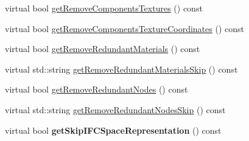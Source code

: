 \begin{DoxyCompactItemize}
\item 
virtual bool \hyperlink{classrepo_1_1manipulator_1_1modelconvertor_1_1_model_import_config_ac0eff0b8fed6e841c234752214cd578d}{get\+Remove\+Components\+Textures} () const 
\item 
virtual bool \hyperlink{classrepo_1_1manipulator_1_1modelconvertor_1_1_model_import_config_af554b2f1e7fda4d0735054140bc84055}{get\+Remove\+Components\+Texture\+Coordinates} () const 
\item 
virtual bool \hyperlink{classrepo_1_1manipulator_1_1modelconvertor_1_1_model_import_config_abb64793a0284558594e64d0d334a1524}{get\+Remove\+Redundant\+Materials} () const 
\item 
virtual std\+::string \hyperlink{classrepo_1_1manipulator_1_1modelconvertor_1_1_model_import_config_a421717d85170235741c84882fc7fa7ea}{get\+Remove\+Redundant\+Materials\+Skip} () const 
\item 
virtual bool \hyperlink{classrepo_1_1manipulator_1_1modelconvertor_1_1_model_import_config_a36c914e41a2e2da3802af667ea0e7afd}{get\+Remove\+Redundant\+Nodes} () const 
\item 
virtual std\+::string \hyperlink{classrepo_1_1manipulator_1_1modelconvertor_1_1_model_import_config_aca67b2ec7898b55bf312598dd778f366}{get\+Remove\+Redundant\+Nodes\+Skip} () const 
\item 
\hypertarget{classrepo_1_1manipulator_1_1modelconvertor_1_1_model_import_config_a6ba075be40eee6ee300b359ca24017b9}{}virtual bool {\bfseries get\+Skip\+I\+F\+C\+Space\+Representation} () const \label{classrepo_1_1manipulator_1_1modelconvertor_1_1_model_import_config_a6ba075be40eee6ee300b359ca24017b9}


\end{DoxyCompactItemize}

